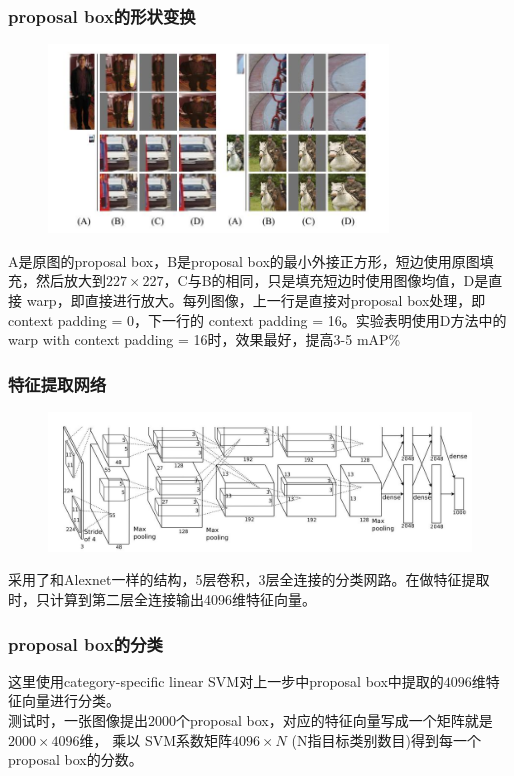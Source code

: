 \documentclass{beamer}
\begin{document}
    \begin{frame}
        \frametitle{proposal box的形状变换}
        \begin{figure}
            \centering
            \includegraphics[height=5cm]{../graphic/rcnnwarp.jpg}
        \end{figure}
        \scriptsize{A是原图的proposal box，B是proposal box的最小外接正方形，短边使用原图填充，然后放大到$227\times 227$，C与B的相同，只是填充短边时使用图像均值，D是直接 warp，即直接进行放大。每列图像，上一行是直接对proposal box处理，即 context padding = 0，下一行的 context padding = 16。实验表明使用D方法中的 warp with context padding = 16时，效果最好，提高3-5 mAP\%}
    \end{frame}
    
    \begin{frame}
        \frametitle{特征提取网络}
        \begin{figure}
            \centering
            \includegraphics[height=3.7cm]{../graphic/alexnet.jpg}
        \end{figure}
        采用了和Alexnet一样的结构，5层卷积，3层全连接的分类网路。在做特征提取时，只计算到第二层全连接输出4096维特征向量。
    \end{frame}
    
    \begin{frame}
        \frametitle{proposal box的分类}
        这里使用category-specific linear SVM对上一步中proposal box中提取的$4096$维特征向量进行分类。 \\
        \vspace{10pt}
        测试时，一张图像提出$2000$个proposal box，对应的特征向量写成一个矩阵就是$2000\times 4096$维， 乘以 SVM系数矩阵$4096\times N$ (N指目标类别数目)得到每一个proposal box的分数。%
    \end{frame}
    
\end{document}
